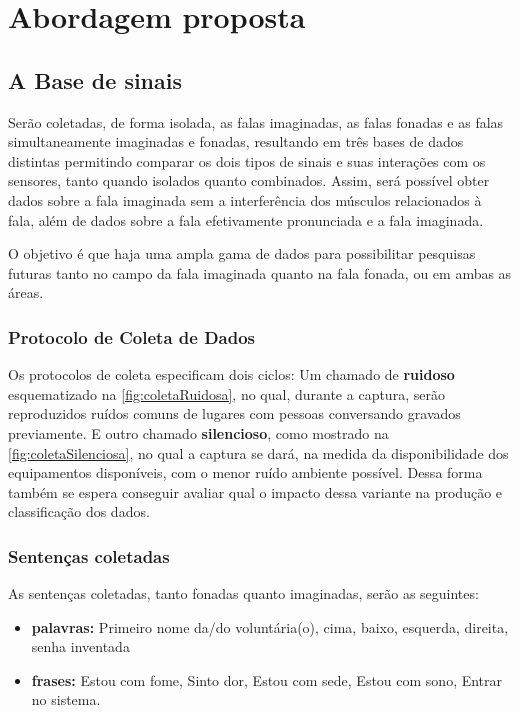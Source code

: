 \chapter{Abordagem proposta} \label{chap:propApproach}
	\section{A Base de sinais}
		\par Serão coletadas, de forma isolada, as falas imaginadas, as falas fonadas e as falas simultaneamente imaginadas e fonadas, resultando em três bases de dados distintas permitindo comparar os dois tipos de sinais e suas interações com os sensores, tanto quando isolados quanto combinados. Assim, será possível obter dados sobre a fala imaginada sem a interferência dos músculos relacionados à fala, além de dados sobre a fala efetivamente pronunciada e a fala imaginada.
		
		\par O objetivo é que haja uma ampla gama de dados para possibilitar pesquisas futuras tanto no campo da fala imaginada quanto na fala fonada, ou em ambas as áreas.
		
	    \subsection{Protocolo de Coleta de Dados}
	    	\label{sec:protocolDeColetaDeDados}
		    
		    \par Os protocolos de coleta especificam dois ciclos: Um chamado de \textbf{ruidoso} esquematizado na \autoref{fig:coletaRuidosa}, no qual, durante a captura, serão reproduzidos ruídos comuns de lugares com pessoas conversando gravados previamente. E outro chamado \textbf{silencioso}, como mostrado na \autoref{fig:coletaSilenciosa}, no qual a captura se dará, na medida da disponibilidade dos equipamentos disponíveis, com o menor ruído ambiente possível. Dessa forma também se espera conseguir avaliar qual o impacto dessa variante na produção e classificação dos dados.
		    
		    \subsection{Sentenças coletadas}
		    
			    \par As sentenças coletadas, tanto fonadas quanto imaginadas, serão as seguintes:
			    \begin{itemize}
			    	\item \textbf{palavras:} Primeiro nome da/do voluntária(o), cima, baixo, esquerda, direita, senha inventada
			    	\item \textbf{frases:} Estou com fome, Sinto dor, Estou com sede, Estou com sono, Entrar no sistema.
			    \end{itemize}
			    
